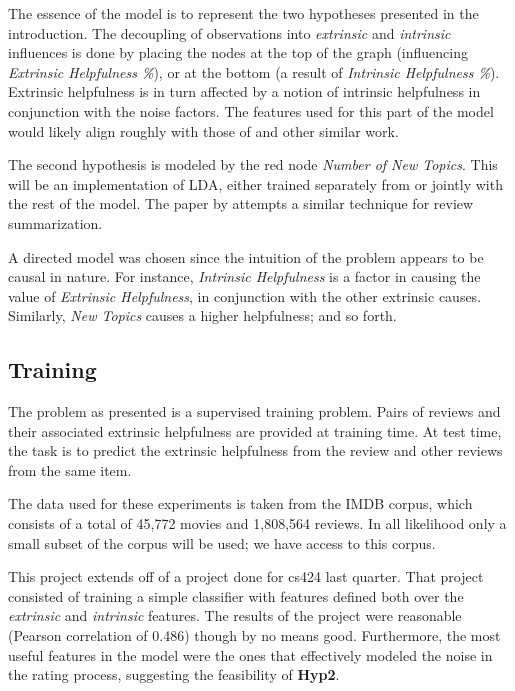 \documentclass[letter,12pt]{article}
\begin{document}
The essence of the model is to represent the two hypotheses presented in the
	introduction. 
The decoupling of observations into {\em extrinsic} and
	{\em intrinsic} influences is done by placing the nodes at the top
	of the graph (influencing {\em Extrinsic Helpfulness \%}), or at the bottom
	(a result of {\em Intrinsic Helpfulness \%}).
Extrinsic helpfulness is in turn affected by a notion of intrinsic helpfulness
	in conjunction with the noise factors.
The features used for this part of the model would likely align roughly with 
	those of  and other similar work.

The second hypothesis is modeled by the red node {\em Number of New Topics}.
This will be an implementation of LDA, either trained separately from or
	jointly with the rest of the model.
The paper by  attempts a similar technique
	for review summarization.

A directed model was chosen since the intuition of the problem appears to
	be causal in nature.
For instance, {\em Intrinsic Helpfulness} is a factor in causing the value of
	{\em Extrinsic Helpfulness}, in conjunction with the other extrinsic
	causes.
Similarly, {\em New Topics} causes a higher helpfulness; and so forth.

\subsection{Training}
The problem as presented is a supervised training problem.
Pairs of reviews and their associated extrinsic helpfulness are provided at
	training time.
At test time, the task is to predict the extrinsic helpfulness from the review
	and other reviews from the same item.

The data used for these experiments is taken from the IMDB corpus, which
	consists of a total of 45,772 movies and 1,808,564 reviews.
In all likelihood only a small subset of the corpus will be used;
	we have access to this corpus.


This project extends off of a project done for cs424 last quarter.
That project consisted of training a simple classifier with features
	defined both over the {\em extrinsic} and {\em intrinsic} features.
The results of the project were reasonable (Pearson correlation of 0.486)
	though by no means good.
Furthermore, the most useful features in the model were the ones that
	effectively modeled the noise in the rating process, suggesting the
	feasibility of {\bf Hyp2}.
\end{document}

